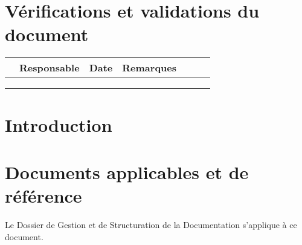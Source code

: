 \documentclass[twoside]{article}
\begin{document}

\section*{Vérifications et validations du document}

\begin{center}
\begin{longtable}{|m{15mm}|m{36mm}|m{36mm}|m{60mm}|}
\hline
 & Responsable & Date & Remarques\endhead \hline

& %

& %

& %

\\\hline

& %

& %

& %

\\\hline

& %

& %

& %

\\\hline

& %

& %

& %

\\\hline
\end{longtable}
\end{center}

\pagebreak


\section{Introduction}


\section{Documents applicables et de référence}

Le Dossier de Gestion et de Structuration de la Documentation s'applique à ce document.
\end{document}
